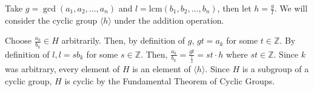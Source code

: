 \documentclass{article}
\begin{document}
\begin{enumerate}
    \smallskip

    Take $g = \gcd(a_1, a_2, \dots, a_n)$ and $l = \text{lcm}(b_1, b_2, \dots, b_n)$, then let $h = \frac{g}{l}$. We will consider the cyclic group $\langle h \rangle$ under the addition operation. 

    \smallskip

    Choose $\frac{a_k}{b_k} \in H$ arbitrarily. Then, by definition of $g$, $gt = a_k$ for some $t \in \mathbb{Z}$. By definition of $l, l = sb_k$ for some $s \in \mathbb{Z}$. Then, $\frac{a_k}{b_k} = \frac{gt}{\frac{l}{s}} = st\cdot h$ where $st \in \mathbb{Z}$. Since $k$ was arbitrary, every element of $H$ is an element of $\langle h \rangle$. Since $H$ is a subgroup of a cyclic group, $H$ is cyclic by the Fundamental Theorem of Cyclic Groups. 
\end{enumerate}
\end{document}
